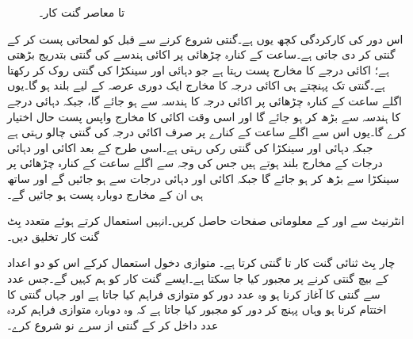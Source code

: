 \begin{figure}
\caption{ تا  معاصر گنت کار۔}
\label{شکل_گنت_کار_معاصر_ہزار}
\end{figure}

اس دور کی کارکردگی کچھ یوں ہے۔گنتی شروع کرنے سے قبل  کو لمحاتی پست کر کے گنتی  کر دی جاتی ہے۔ساعت کے کنارہ چڑھائی پر اکائی ہندسے کی گنتی بتدریج بڑھتی ہے؛ اکائی درجے کا مخارج  پست رہتا ہے جو دہائی اور سینکڑا کی گنتی روک کر رکھتا ہے۔گنتی  تک پہنچتے ہی اکائی درجہ کا مخارج  ایک دوری عرصہ کے لیے بلند ہو گا۔یوں اگلے ساعت کے کنارہ چڑھائی پر اکائی درجہ کا ہندسہ سے  ہو جائے گا، جبکہ دہائی درجے کا ہندسہ  سے بڑھ کر  ہو جائے گا اور اسی وقت اکائی کا مخارج  واپس پست حال اختیار کرے گا۔یوں اس سے اگلے ساعت کے کنارے پر صرف اکائی درجہ کی گنتی چالو رہتی ہے جبکہ دہائی اور سینکڑا کی گنتی رکی رہتی ہے۔اسی طرح  کے بعد اکائی اور دہائی درجات کے مخارج  بلند ہوتے ہیں جس کی وجہ سے اگلے ساعت کے کنارہ چڑھائی پر سینکڑا  سے بڑھ کر  ہو جائے گا جبکہ اکائی اور دہائی درجات  سے  ہو جائیں گے اور ساتھ ہی ان کے مخارج  دوبارہ پست ہو جائیں گے۔

انٹرنیٹ سے  اور  کے معلوماتی صفحات حاصل کریں۔انہیں استعمال کرتے ہوئے متعدد بِٹ گنت کار تخلیق دیں۔


چار بِٹ ثنائی گنت کار  تا  گنتی کرتا ہے۔ متوازی دخول استعمال کرکے اس کو دو اعداد کے بیچ گنتی کرنے پر مجبور کیا جا سکتا ہے۔ایسے گنت کار کو ہم کہیں گے۔جس عدد سے گنتی کا آغاز کرنا ہو وہ عدد دور کو متوازی فراہم کیا جاتا ہے اور جہاں گنتی کا اختتام کرنا ہو وہاں پہنچ کر دور کو مجبور کیا جاتا ہے کہ وہ دوبارہ متوازی فراہم کردہ عدد داخل کر کے گنتی از سرے نو شروع کرے۔

